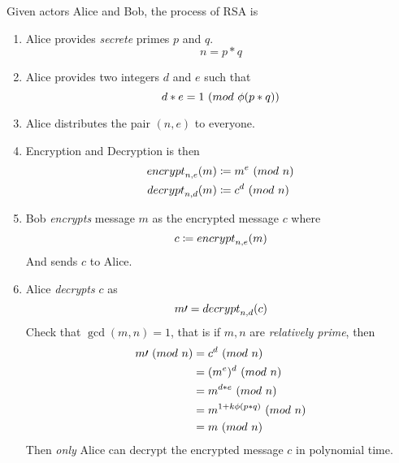 \begin{definition}
    Given actors Alice and Bob, the process of RSA is
    \begin{enumerate}
        \item Alice provides \textit{secrete} primes $p$ and $q$.
        \begin{equation}
            n = p \ast q
        \end{equation}
        \item Alice provides two integers $d$ and $e$ such that
        \begin{equation}
            d \ast e = 1 \ (\relax{mod}\ \phi(p \ast q))
        \end{equation}
        \item Alice distributes the pair $(n, e)$ to everyone.
        \item Encryption and Decryption is then
        \begin{align}
            \relax{encrypt}_{n, e}(m) &\coloneqq m^e \ (\relax{mod}\ n) \\
            \relax{decrypt}_{n, d}(m) &\coloneqq c^d \ (\relax{mod}\ n)
        \end{align}
        \item Bob \textit{encrypts} message $m$ as the encrypted message $c$ where
        \begin{equation}
            c \coloneqq \relax{encrypt}_{n, e}(m)
        \end{equation}
        And sends $c$ to Alice.
        \item Alice \textit{decrypts} $c$ as
        \begin{equation}
            m\prime = \relax{decrypt}_{n, d}(c)
        \end{equation}
        Check that $\gcd(m, n) = 1$, that is if $m, n$ are \textit{relatively prime}, then
        \begin{align}
            m\prime \ (\relax{mod}\ n) &= c^d \ (\relax{mod}\ n) \\
                            &= (m^e)^d \ (\relax{mod}\ n) \\
                            &= m^{d \ast e} \ (\relax{mod}\ n) \\
                            &= m^{1 + k\phi(p \ast q)} \ (\relax{mod}\ n) \\
                            &= m \ (\relax{mod}\ n)
        \end{align}
        Then \textit{only} Alice can decrypt the encrypted message $c$ in polynomial time.
    \end{enumerate}
\end{definition}

